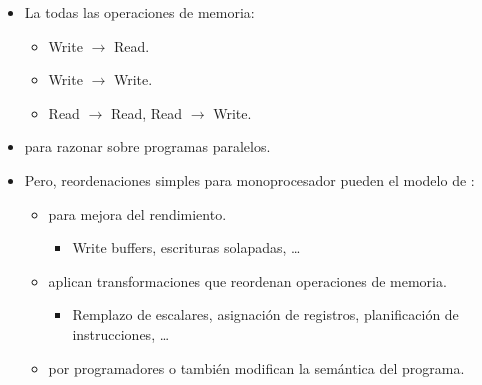 \begin{frame}[t]
\begin{itemize}
  \item La   todas las operaciones de memoria:
    \begin{itemize}
      \item Write $\rightarrow$ Read.
      \item Write $\rightarrow$ Write.
      \item Read $\rightarrow$ Read, Read $\rightarrow$ Write.
    \end{itemize}

  \item {} para razonar sobre programas paralelos.

  \item Pero, reordenaciones simples para monoprocesador pueden  
        el modelo de :
    \begin{itemize}
      \item {} para mejora del rendimiento.
        \begin{itemize}
          \item Write buffers, escrituras solapadas, \ldots
        \end{itemize}
      \item {} aplican transformaciones que reordenan operaciones de memoria.
        \begin{itemize}
          \item Remplazo de escalares, asignación de registros, planificación de instrucciones, \ldots
        \end{itemize}
      \item {} por programadores o 
             también modifican 
            la semántica del programa.
    \end{itemize}
\end{itemize}
\end{frame}

